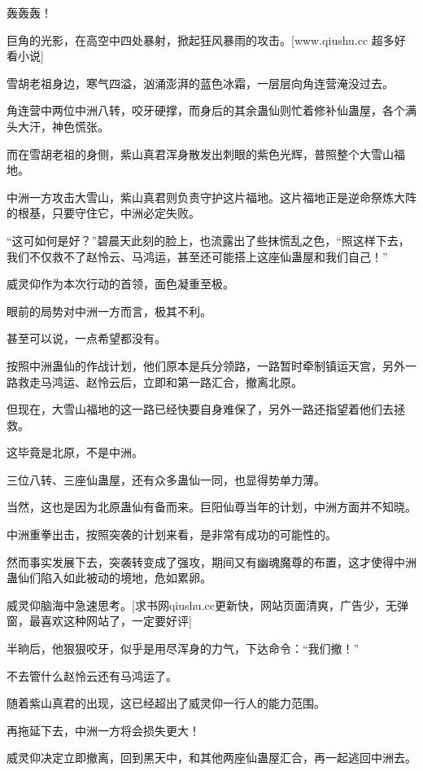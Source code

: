 
\begin{this_body}

轰轰轰！

巨角的光影，在高空中四处暴射，掀起狂风暴雨的攻击。[www.qiushu.cc 超多好看小说]

雪胡老祖身边，寒气四溢，汹涌澎湃的蓝色冰霜，一层层向角连营淹没过去。

角连营中两位中洲八转，咬牙硬撑，而身后的其余蛊仙则忙着修补仙蛊屋，各个满头大汗，神色慌张。

而在雪胡老祖的身侧，紫山真君浑身散发出刺眼的紫色光辉，普照整个大雪山福地。

中洲一方攻击大雪山，紫山真君则负责守护这片福地。这片福地正是逆命祭炼大阵的根基，只要守住它，中洲必定失败。

“这可如何是好？”碧晨天此刻的脸上，也流露出了些抹慌乱之色，“照这样下去，我们不仅救不了赵怜云、马鸿运，甚至还可能搭上这座仙蛊屋和我们自己！”

威灵仰作为本次行动的首领，面色凝重至极。

眼前的局势对中洲一方而言，极其不利。

甚至可以说，一点希望都没有。

按照中洲蛊仙的作战计划，他们原本是兵分领路，一路暂时牵制镇运天宫，另外一路救走马鸿运、赵怜云后，立即和第一路汇合，撤离北原。

但现在，大雪山福地的这一路已经快要自身难保了，另外一路还指望着他们去拯救。

这毕竟是北原，不是中洲。

三位八转、三座仙蛊屋，还有众多蛊仙一同，也显得势单力薄。

当然，这也是因为北原蛊仙有备而来。巨阳仙尊当年的计划，中洲方面并不知晓。

中洲重拳出击，按照突袭的计划来看，是非常有成功的可能性的。

然而事实发展下去，突袭转变成了强攻，期间又有幽魂魔尊的布置，这才使得中洲蛊仙们陷入如此被动的境地，危如累卵。

威灵仰脑海中急速思考。[求书网qiushu.cc更新快，网站页面清爽，广告少，无弹窗，最喜欢这种网站了，一定要好评]

半晌后，他狠狠咬牙，似乎是用尽浑身的力气，下达命令：“我们撤！”

不去管什么赵怜云还有马鸿运了。

随着紫山真君的出现，这已经超出了威灵仰一行人的能力范围。

再拖延下去，中洲一方将会损失更大！

威灵仰决定立即撤离，回到黑天中，和其他两座仙蛊屋汇合，再一起逃回中洲去。


\end{this_body}

